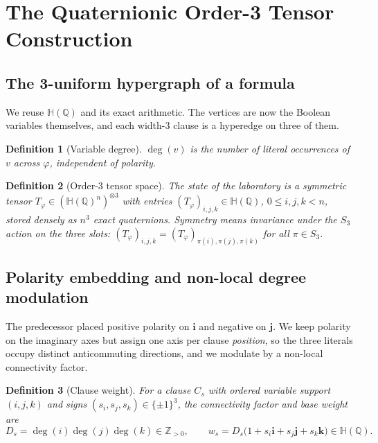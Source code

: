 \documentclass[pdflatex,sn-mathphys-num]{sn-jnl}
\theoremstyle{thmstyleone}%
\theoremstyle{thmstyletwo}%
\theoremstyle{thmstylethree}%
\newtheorem{definition}{Definition}%
\newcommand{\HH}{\mathbb{H}}
\newcommand{\QQ}{\mathbb{Q}}
\newcommand{\ZZ}{\mathbb{Z}}
\newcommand{\bi}{\mathbf{i}}
\newcommand{\bj}{\mathbf{j}}
\newcommand{\bk}{\mathbf{k}}
\newcommand{\Tphi}{T_{\varphi}}
\DeclareMathOperator{\deggr}{deg}
\begin{document}
\newpage

\section{The Quaternionic Order-3 Tensor Construction}\label{sec:tensor}

\subsection{The 3-uniform hypergraph of a formula}

We reuse $\HH(\QQ)$ and its exact arithmetic. The vertices are now the
Boolean variables themselves, and each width-$3$ clause is a hyperedge on
three of them.

\begin{definition}[Variable degree]\label{def:degt}
$\deggr(v)$ is the number of literal occurrences of $v$ across $\varphi$,
independent of polarity.
\end{definition}

\begin{definition}[Order-3 tensor space]\label{def:tensorspace}
The state of the laboratory is a symmetric tensor
$\Tphi\in(\HH(\QQ)^{n})^{\otimes3}$ with entries
$(\Tphi)_{i,j,k}\in\HH(\QQ)$, $0\le i,j,k<n$, stored densely as $n^3$
exact quaternions. Symmetry means invariance under the $S_3$ action on the
three slots: $(\Tphi)_{i,j,k}=(\Tphi)_{\pi(i),\pi(j),\pi(k)}$ for all
$\pi\in S_3$.
\end{definition}

\subsection{Polarity embedding and non-local degree modulation}

The predecessor placed positive polarity on $\bi$ and negative on $\bj$.
We keep polarity on the imaginary axes but assign one axis per clause
\emph{position}, so the three literals occupy distinct anticommuting
directions, and we modulate by a non-local connectivity factor.

\begin{definition}[Clause weight]\label{def:weight}
For a clause $C_s$ with ordered variable support $(i,j,k)$ and signs
$(s_i,s_j,s_k)\in\{\pm1\}^3$, the connectivity factor and base weight are
\begin{equation}\label{eq:weight}
  D_s=\deggr(i)\deggr(j)\deggr(k)\in\ZZ_{>0},\qquad
  w_s=D_s\big(1+s_i\bi+s_j\bj+s_k\bk\big)\in\HH(\QQ).
\end{equation}
\end{definition}
\end{document}
